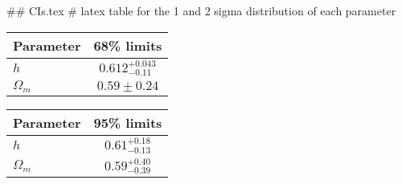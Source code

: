 ## CIs.tex
# latex table for the 1 and 2 sigma distribution of each parameter

\begin{tabular} { l  c}
 Parameter &  68\% limits\\
\hline
{\boldmath$h              $} & $0.612^{+0.043}_{-0.11}    $\\
{\boldmath$\Omega_m       $} & $0.59\pm 0.24              $\\
\hline
\end{tabular}

\begin{tabular} { l  c}
 Parameter &  95\% limits\\
\hline
{\boldmath$h              $} & $0.61^{+0.18}_{-0.13}      $\\
{\boldmath$\Omega_m       $} & $0.59^{+0.40}_{-0.39}      $\\
\hline
\end{tabular}
